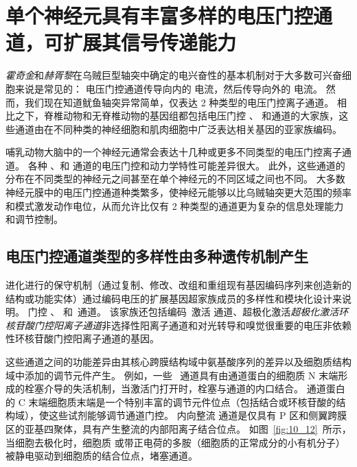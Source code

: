 \section{单个神经元具有丰富多样的电压门控通道，可扩展其信号传递能力}

\textit{霍奇金}和\textit{赫胥黎}在乌贼巨型轴突中确定的电兴奋性的基本机制对于大多数可兴奋细胞来说是常见的：
电压门控通道传导向内的  电流，然后传导向外的  电流。
然而，我们现在知道鱿鱼轴突异常简单，仅表达 2 种类型的电压门控离子通道。
相比之下，脊椎动物和无脊椎动物的基因组都包括电压门控 、 和通道的大家族，这些通道由在不同种类的神经细胞和肌肉细胞中广泛表达相关基因的亚家族编码。


哺乳动物大脑中的一个神经元通常会表达十几种或更多不同类型的电压门控离子通道。
各种 、和  通道的电压门控和动力学特性可能差异很大。
此外，这些通道的分布在不同类型的神经元之间甚至在单个神经元的不同区域之间也不同。
大多数神经元膜中的电压门控通道种类繁多，使神经元能够以比乌贼轴突更大范围的频率和模式激发动作电位，从而允许比仅有 2 种类型的通道更为复杂的信息处理能力和调节控制。



\subsection{电压门控通道类型的多样性由多种遗传机制产生}

进化进行的保守机制（通过复制、修改、改组和重组现有基因编码序列来创造新的结构或功能实体）通过编码电压的扩展基因超家族成员的多样性和模块化设计来说明。 
门控 、 和~通道。
该家族还包括编码~激活  通道、超极化激活\textit{超极化激活环核苷酸门控阳离子通道}非选择性阳离子通道和对光转导和嗅觉很重要的电压非依赖性环核苷酸门控阳离子通道的基因。


这些通道之间的功能差异由其核心跨膜结构域中氨基酸序列的差异以及细胞质结构域中添加的调节元件产生。
例如，一些~ 通道具有由通道蛋白的细胞质 N 末端形成的栓塞介导的失活机制，当激活门打开时，栓塞与通道的内口结合。
通道蛋白的 C 末端细胞质末端是一个特别丰富的调节元件位点（包括结合或环核苷酸的结构域），使这些试剂能够调节通道门控。
内向整流  通道是仅具有 P 区和侧翼跨膜区的亚基四聚体，具有产生整流的内部阳离子结合位点。
如图~\ref{fig:10_12}~所示，当细胞去极化时，细胞质  或带正电荷的多胺（细胞质的正常成分的小有机分子）被静电驱动到细胞质的结合位点，堵塞通道。


